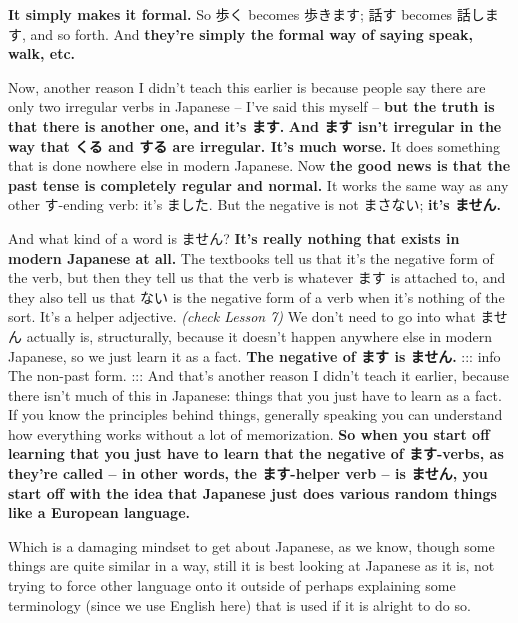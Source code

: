 {}

{\bf It simply makes it formal.} So 歩く becomes 歩きます; 話す becomes 話します, and so forth. And {\bf they're simply the formal way of saying speak, walk, etc.}

\thinrule

Now, another reason I didn't teach this earlier is because people say there are only two irregular verbs in Japanese -- I've said this myself -- {\bf but the truth is that there is another one,} {\bf and it's ます.} {\bf And ます isn't irregular in the way that くる and する are irregular. It's much worse.} It does something that is done nowhere else in modern Japanese. Now {\bf the good news is that the past tense is completely regular and normal.} It works the same way as any other す-ending verb: it's ました. But the negative is not まさない; {\bf it's ません.}

{}

\startsectionlevel[title={ません},reference={ません}]

And what kind of a word is ません? {\bf It's really nothing that exists in modern Japanese at all.} The textbooks tell us that it's the negative form of the verb, but then they tell us that the verb is whatever ます is attached to, and they also tell us that ない is the negative form of a verb when it's nothing of the sort. It's a helper adjective. {\em (check Lesson 7)} We don't need to go into what ません actually is, structurally, because it doesn't happen anywhere else in modern Japanese, so we just learn it as a fact. {\bf The negative of ます is ません.} ::: info The non-past form. ::: And that's another reason I didn't teach it earlier, because there isn't much of this in Japanese: things that you just have to learn as a fact. If you know the principles behind things, generally speaking you can understand how everything works without a lot of memorization. {\bf So when you start off learning that you just have to learn that the negative of ます-verbs, as they're called -- in other words, the ます-helper verb -- is ません, you start off with the idea that Japanese just does various random things like a European language.}

Which is a damaging mindset to get about Japanese, as we know, though some things are quite similar in a way, still it is best looking at Japanese as it is, not trying to force other language onto it outside of perhaps explaining some terminology (since we use English here) that is used if it is alright to do so.

